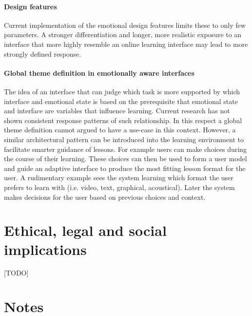 \paragraph{Design features}
Current implementation of the emotional design features limits these to only few parameters. A stronger differentiation and longer, more realistic exposure to an interface that more highly resemble an online learning interface may lead to more strongly defined response.

\paragraph{Global theme definition in emotionally aware interfaces}
The idea of an interface that can judge which task is more supported by which interface and emotional state is based on the prerequisite that emotional state and interface are variables that influence learning. Current research has not shown consistent response patterns of such relationship. In this respect a global theme definition cannot argued to have a use-case in this context. However, a similar architectural pattern can be introduced into the learning environment to facilitate smarter guidance of lessons. For example users can make choices during the course of their learning. These choices can then be used to form a user model and guide an adaptive interface to produce the most fitting lesson format for the user.
A rudimentary example sees the system learning which format the user prefers to learn with (i.e. video, text, graphical, acoustical). Later the system makes decisions for the user based on previous choices and context.




\section{Ethical, legal and social implications}

[TODO]

\section{Notes}

